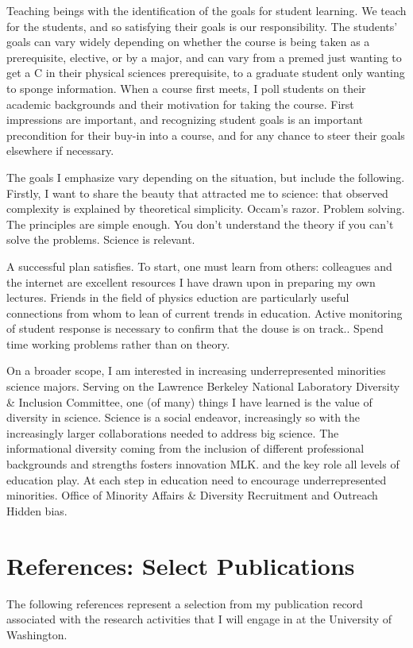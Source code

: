 \documentclass{article}
\begin{document}
Teaching beings with the identification of the goals for student learning.  We teach for the students,
and so satisfying their goals is  our responsibility.
The students' goals
can vary widely depending on whether the course is being taken as a prerequisite, elective,
or by a major, and 
can vary from a premed just wanting to get a C in their physical sciences prerequisite, to
a graduate student only wanting to sponge information.  When a course first meets, I poll students on their 
academic backgrounds
and their motivation for taking the course.  
First impressions are important, and recognizing student goals is 
an important precondition for their buy-in into a course, and for any chance to steer their goals elsewhere if necessary.

The goals I emphasize vary depending on the situation, but include the following. Firstly, I want to share the beauty
that attracted me to science: that observed complexity is explained by theoretical simplicity.  Occam's razor.
Problem solving.  The principles are simple enough.  You don't understand the theory if you can't solve the problems.
Science is relevant.

A successful plan satisfies.
To start, one must learn from others:
colleagues and the internet are excellent resources I have drawn upon in preparing
my own lectures.  Friends in the field of physics eduction are particularly useful connections from
whom to lean of current  trends in education.  Active monitoring of student response is necessary
to confirm that the douse is on track..
Spend time working problems rather than on theory.


On a broader scope, I am interested in increasing underrepresented minorities science majors.
Serving on the Lawrence Berkeley National Laboratory Diversity \& Inclusion Committee, one (of many) things I have
learned is the value of diversity in science.  Science is a social endeavor, increasingly so with
the increasingly larger collaborations needed to address big science.  The informational diversity
coming  from the inclusion of different professional backgrounds and strengths fosters innovation
MLK.
 and the key role all levels of education play.  At each step
in education need to encourage underrepresented minorities.
Office of Minority Affairs \& Diversity Recruitment and Outreach
Hidden bias.



\section{References: Select Publications}
The following references represent a selection from my publication record associated with the research
activities that I will engage in at the University of Washington.



\end{document}
